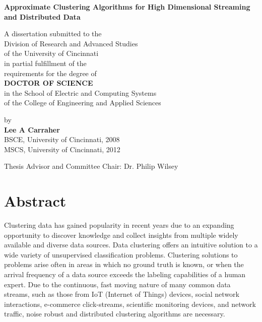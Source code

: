 


\thispagestyle{empty}

\doublespacing

\vspace*{0.5in}

\begin{center}
\LARGE{\textbf{Approximate Clustering Algorithms for High
Dimensional Streaming and Distributed Data}}


\vspace*{0.4in}

  {\large A dissertation submitted to the\\[0.20in]
    Division of Research and Advanced Studies\\
    of the University of Cincinnati\\[0.20in]
    in partial fulfillment of the\\
    requirements for the degree of\\[0.20in]
    {\bf DOCTOR OF SCIENCE}\\[0.20in]
    in the School of Electric and Computing Systems\\
    of the College of Engineering and Applied Sciences\\[0.20in]
    \date{\today} 
    by\\[0.20in]
    {\bf Lee A Carraher}\\
    BSCE, University of Cincinnati, 2008\\
    MSCS, University of Cincinnati, 2012\\}
  \vspace{0.5in}
  {\large Thesis Advisor and Committee Chair:  Dr. Philip Wilsey}
\end{center}





\newpage
\thispagestyle{empty}
\mbox{}

\chapter*{Abstract} 
Clustering data has gained popularity in recent years due to an expanding opportunity to discover knowledge and collect
insights from multiple widely available and diverse data sources.  Data clustering offers an intuitive solution to a
wide variety of unsupervised classification problems.  Clustering solutions to problems arise often in areas in which no
ground truth is known, or when the arrival frequency of a data source exceeds the labeling capabilities of a human
expert.  Due to the continuous, fast moving nature of many common data streams, such as those from IoT (Internet of
Things) devices, social network interactions, e-commerce click-streams, scientific monitoring devices, and network
traffic, noise robust and distributed clustering algorithms are necessary.

